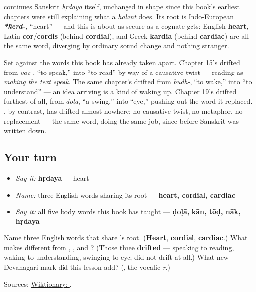\begin{cousinweb}
\textbf{} continues Sanskrit \textbf{} \emph{hṛdaya} itself, unchanged in shape since this book's earliest chapters were still explaining what a \emph{halant} does. Its root is Indo-European \emph{\textbf{*\'{k}ērd-}}, \textquotedblleft{}heart\textquotedblright{} — and this is about as secure as a cognate gets: English \textbf{heart}, Latin \textbf{cor}/\textbf{cordis} (behind \textbf{cordial}), and Greek \textbf{kardia} (behind \textbf{cardiac}) are all the same word, diverging by ordinary sound change and nothing stranger.
\end{cousinweb}

\begin{culture}
Set \textbf{} against the words this book has already taken apart. Chapter 15's \textbf{} drifted from \emph{vac-}, \textquotedblleft{}to speak,\textquotedblright{} into \textquotedblleft{}to read\textquotedblright{} by way of a causative twist — reading as \emph{making the text speak}. The same chapter's \textbf{} drifted from \emph{budh-}, \textquotedblleft{}to wake,\textquotedblright{} into \textquotedblleft{}to understand\textquotedblright{} — an idea arriving is a kind of waking up. Chapter 19's \textbf{} drifted furthest of all, from \emph{dola}, \textquotedblleft{}a swing,\textquotedblright{} into \textquotedblleft{}eye,\textquotedblright{} pushing out the word it replaced. \textbf{}, by contrast, has drifted almost nowhere: no causative twist, no metaphor, no replacement — the same word, doing the same job, since before Sanskrit was written down.
\end{culture}

\subsection*{Your turn}
\begin{itemize}
\raggedright
  \item \emph{Say it:} \textbf{hṛdaya} — heart
  \item \emph{Name:} three English words sharing its root — \textbf{heart, cordial, cardiac}
  \item \emph{Say it:} all five body words this book has taught — \textbf{ḍoḷā, kān, tõḍ, nāk, hṛdaya}
\end{itemize}

\begin{tcolorbox}[breakable,colback=teal!4,colframe=teal!35!black,title={Before you move on}]
Name three English words that share \textbf{}'s root. (\textbf{Heart}, \textbf{cordial}, \textbf{cardiac}.) What makes \textbf{} different from \textbf{}, \textbf{}, and \textbf{}? (Those three \textbf{drifted} — speaking to reading, waking to understanding, swinging to eye; \textbf{} did not drift at all.) What new Devanagari mark did this lesson add? (\textbf{}, the vocalic \emph{r}.)

Sources: \href{https://en.wiktionary.org/wiki/\%E0\%A4\%B9\%E0\%A5\%83\%E0\%A4\%A6\%E0\%A4\%AF}{Wiktionary: }.
\end{tcolorbox}
